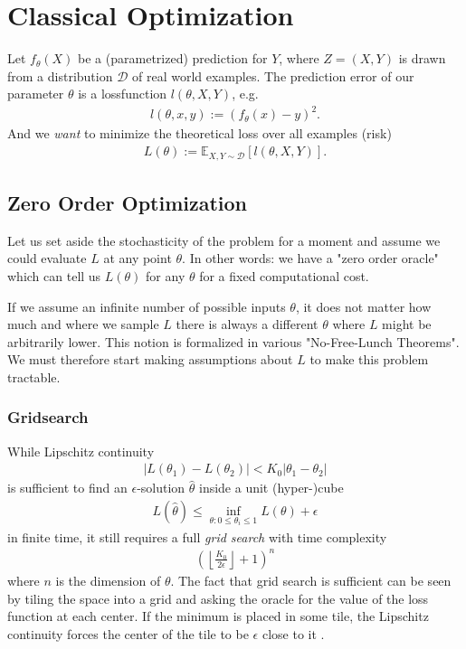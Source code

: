 
\newcommand{\dist}{\mathcal{D}}
\newcommand{\E}{\mathbb{E}}

\chapter{Classical Optimization}

Let \(f_\theta(X)\) be a (parametrized) prediction for \(Y\), where \(Z=(X,Y)\)
is drawn from a distribution \(\dist\) of real world examples. The prediction
error of our parameter \(\theta\) is a lossfunction \(l(\theta, X, Y)\), e.g. 
%
\begin{align*}
	l(\theta, x, y) := (f_\theta(x) - y)^2.
\end{align*}
%
And we \emph{want} to minimize the theoretical loss over all examples (risk)
%
\begin{align*}
	L(\theta) := \E_{X,Y\sim \dist} [l(\theta, X, Y)].
\end{align*}

\section{Zero Order Optimization}

Let us set aside the stochasticity of the problem for a moment and assume we
could evaluate \(L\) at any point \(\theta\). In other words: we have a "zero
order oracle" which can tell us \(L(\theta)\) for any \(\theta\) for a fixed
computational cost.

If we assume an infinite number of possible inputs \(\theta\), it does not matter
how much and where we sample \(L\) there is always a different \(\theta\) where
\(L\) might be arbitrarily lower. This notion is formalized in various "No-Free-Lunch
Theorems". We must therefore start making assumptions about \(L\) to make this
problem tractable.

\subsection{Gridsearch}

While Lipschitz continuity 
%
\begin{align*}
	| L(\theta_1) - L(\theta_2) | < K_0 | \theta_1 - \theta_2 |
\end{align*}
%
is sufficient to find an \(\epsilon\)-solution \(\hat{\theta}\) inside a unit
(hyper-)cube
%
\begin{align*}
	L(\hat{\theta}) \le \inf_{\theta: 0\le\theta_i\le 1} L(\theta) + \epsilon
\end{align*}
%
in finite time, it still requires a full \emph{grid search} with time complexity
%
\begin{align*}
	\left(\left\lfloor \frac{K_0}{2\epsilon}\right\rfloor + 1\right)^n
\end{align*}
%
where \(n\) is the dimension of \(\theta\). The fact that grid search is
sufficient can be seen by tiling the space into a grid and asking the oracle
for the value of the loss function at each center. If the minimum is placed in
some tile, the Lipschitz continuity forces the center of the tile to be \(\epsilon\)
close to it \parencite[cf.][p. 11]{nesterovLecturesConvexOptimization2018}.

